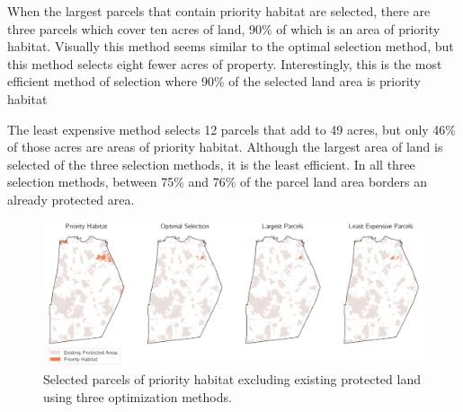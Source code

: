 \documentclass[12pt, stu, floatsintext,table]{apa7}
\begin{document}
When the largest parcels that contain priority habitat are selected, there are three parcels which cover ten acres of land, 90\% of which is an area of priority habitat. Visually this method seems similar to the optimal selection method, but this method selects eight fewer acres of property. Interestingly, this is the most efficient method of selection where 90\% of the selected land area is priority habitat

The least expensive method selects 12 parcels that add to 49 acres, but only 46\% of those acres are areas of priority habitat. Although the largest area of land is selected of the three selection methods, it is the least efficient. In all three selection methods, between 75\% and 76\% of the parcel land area borders an already protected area. 
\begin{figure}[hbtp]
    \centering
    \includegraphics[width = \textwidth]{figures/n_61prihab.png}
    \caption{Selected parcels of priority habitat excluding existing protected land using three optimization methods. }
\end{figure}
\begin{table}[hbtp]
\caption{Summary of priority habitat parcel selections using three methods.}
\end{table}
\end{document}
